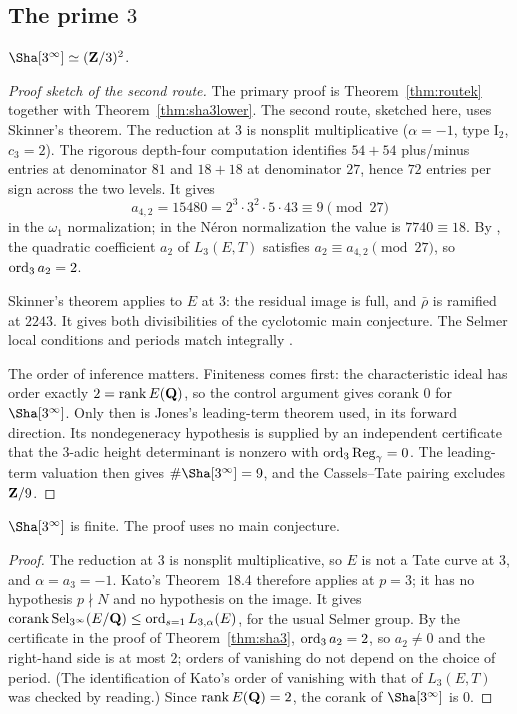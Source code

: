 \subsection[The prime 3]{The prime $3$}
\begin{theorem}\label{thm:sha3}
$\Sha[3^\infty]\simeq(\Z/3)^2$.
\end{theorem}
\begin{proof}[Proof sketch of the second route]
The primary proof is Theorem~\ref{thm:routek} together with Theorem~\ref{thm:sha3lower}. The second route, sketched here, uses Skinner's theorem. The reduction at $3$ is nonsplit multiplicative ($\alpha=-1$, type $\mathrm{I}_2$, $c_3=2$). The rigorous depth-four computation identifies $54+54$ plus/minus entries at denominator $81$ and $18+18$ at denominator $27$, hence $72$ entries per sign across the two levels. It gives
\[
a_{4,2}=15480=2^3\cdot3^2\cdot5\cdot43\equiv9\pmod{27}
\]
in the $\omega_1$ normalization; in the N\'eron normalization the value is $7740\equiv18$. By \cite[Prop.~3.5]{sw}, the quadratic coefficient $a_2$ of $L_3(E,T)$ satisfies $a_2\equiv a_{4,2}\pmod{27}$, so $\operatorname{ord}_3a_2=2$.

Skinner's theorem \cite[Thm.~A]{skinner} applies to $E$ at $3$: the residual image is full, and $\bar\rho$ is ramified at $2243$. It gives both divisibilities of the cyclotomic main conjecture. The Selmer local conditions and periods match integrally \cite{gv}.

The order of inference matters. Finiteness comes first: the characteristic ideal has order exactly $2=\operatorname{rank} E(\mathbf{Q})$, so the control argument gives corank $0$ for $\Sha[3^\infty]$. Only then is Jones's leading-term theorem \cite[Thm.~3.1]{jones} used, in its forward direction. Its nondegeneracy hypothesis is supplied by an independent certificate that the $3$-adic height determinant is nonzero with $\operatorname{ord}_3\operatorname{Reg}_\gamma=0$. The leading-term valuation then gives $\#\Sha[3^\infty]=9$, and the Cassels--Tate pairing excludes $\mathbf{Z}/9$.
\end{proof}

\begin{theorem}\label{thm:sha3fin}
$\Sha[3^\infty]$ is finite. The proof uses no main conjecture.
\end{theorem}
\begin{proof}
The reduction at $3$ is nonsplit multiplicative, so $E$ is not a Tate curve at $3$, and $\alpha=a_3=-1$. Kato's Theorem~18.4 \cite{kato} therefore applies at $p=3$; it has no hypothesis $p\nmid N$ and no hypothesis on the image. It gives $\operatorname{corank}\operatorname{Sel}_{3^\infty}(E/\mathbf{Q})\le\operatorname{ord}_{s=1}L_{3,\alpha}(E)$, for the usual Selmer group. By the certificate in the proof of Theorem~\ref{thm:sha3}, $\operatorname{ord}_3a_2=2$, so $a_2\ne0$ and the right-hand side is at most $2$; orders of vanishing do not depend on the choice of period. (The identification of Kato's order of vanishing with that of $L_3(E,T)$ was checked by reading.) Since $\operatorname{rank} E(\mathbf{Q})=2$, the corank of $\Sha[3^\infty]$ is $0$.
\end{proof}

